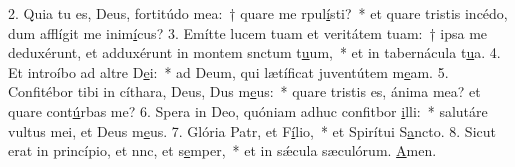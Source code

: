 2. Quia tu es, Deus, fortitúdo mea:~† quare me rpul\uline{í}sti?~* et quare tristis incédo, dum afflígit me inim\uline{í}cus?
3. Emítte lucem tuam et veritátem tuam:~† ipsa me deduxérunt, et adduxérunt in montem snctum t\uline{u}um,~* et in tabernácula t\uline{u}a.
4. Et introíbo ad altre D\uline{e}i:~* ad Deum, qui lætíficat juventútem m\uline{e}am.
5. Confitébor tibi in cíthara, Deus, Dus m\uline{e}us:~* quare tristis es, ánima mea? et quare cont\uline{ú}rbas me?
6. Spera in Deo, quóniam adhuc confitbor \uline{i}lli:~* salutáre vultus mei, et Deus m\uline{e}us.
7. Glória Patr, et F\uline{í}lio,~* et Spirítui S\uline{a}ncto.
8. Sicut erat in princípio, et nnc, et s\uline{e}mper,~* et in sǽcula sæculórum. \uline{A}men.
